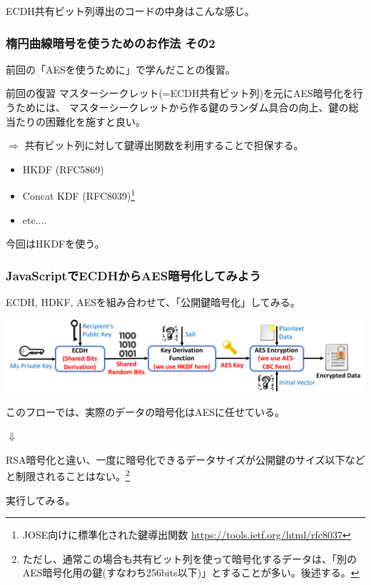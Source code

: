 \documentclass[12pt,dvipdfmx]{beamer}
\begin{document}
\begin{frame}
ECDH共有ビット列導出のコードの中身はこんな感じ。
\end{frame}

\begin{frame}
\frametitle{楕円曲線暗号を使うためのお作法 その2}
前回の「AESを使うために」で学んだことの復習。

\begin{block}{\small 前回の復習}
マスターシークレット(=ECDH共有ビット列)を元にAES暗号化を行うためには、
\alert{マスターシークレットから作る鍵のランダム具合の向上、鍵の総当たりの困難化}を施すと良い。
\end{block}


$\Rightarrow$ 共有ビット列に対して鍵導出関数を利用することで担保する。
\begin{itemize}
 \item HKDF (RFC5869)
 \item Concat KDF (RFC8039)\footnote[frame]{\scriptsize JOSE向けに標準化された鍵導出関数 \url{https://tools.ietf.org/html/rfc8037}}
 \item etc....
\end{itemize}
今回はHKDFを使う。
\end{frame}

\begin{frame}
\frametitle{JavaScriptでECDHからAES暗号化してみよう}
ECDH, HDKF, AESを組み合わせて、「公開鍵暗号化」してみる。

\begin{center}
\includegraphics[width=\linewidth]{Figs/ecdh-flow03.pdf}
\end{center}

このフローでは、\alert{実際のデータの暗号化はAESに任せている}。
\begin{center}
 $\Downarrow$
\end{center}
RSA暗号化と違い、一度に暗号化できるデータサイズが公開鍵のサイズ以下などと制限されることはない。\footnote[frame]{\scriptsize ただし、通常この場合も共有ビット列を使って暗号化するデータは、「別のAES暗号化用の鍵(すなわち256bits以下)」とすることが多い。後述する。}
\end{frame}

\begin{frame}
実行してみる。
 
\end{frame}
\end{document}

